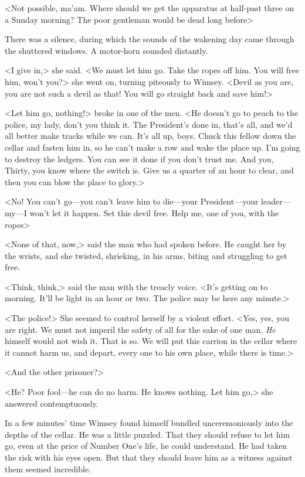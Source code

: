 <Not possible, ma'am. Where should we get the apparatus at half-past three on a Sunday morning? The poor gentleman would be dead long before\longdash>

There was a silence, during which the sounds of the wakening day came through the shuttered windows. A motor-horn sounded distantly.

<I give in,> she said. <We must let him go. Take the ropes off him. You will free him, won't you?> she went on, turning piteously to Wimsey. <Devil as you are, you are not such a devil as that! You will go straight back and save him!>

<Let him go, nothing!> broke in one of the men. <He doesn't go to peach to the police, my lady, don't you think it. The President's done in, that's all, and we'd all better make tracks while we can. It's all up, boys. Chuck this fellow down the cellar and fasten him in, so he can't make a row and wake the place up. I'm going to destroy the ledgers. You can see it done if you don't trust me. And you, Thirty, you know where the switch is. Give us a quarter of an hour to clear, and then you can blow the place to glory.>

<No! You can't go—you can't leave him to die—your President—your leader—my—I won't let it happen. Set this devil free. Help me, one of you, with the ropes\longdash>

<None of that, now,> said the man who had spoken before. He caught her by the wrists, and she twisted, shrieking, in his arms, biting and struggling to get free.

<Think, think,> said the man with the treacly voice. <It's getting on to morning. It'll be light in an hour or two. The police may be here any minute.>

<The police!> She seemed to control herself by a violent effort. <Yes, yes, you are right. We must not imperil the safety of all for the sake of one man. \textit{He} himself would not wish it. That is so. We will put this carrion in the cellar where it cannot harm us, and depart, every one to his own place, while there is time.>

<And the other prisoner?>

<He? Poor fool—he can do no harm. He knows nothing. Let him go,> she answered contemptuously.

In a few minutes' time Wimsey found himself bundled unceremoniously into the depths of the cellar. He was a little puzzled. That they should refuse to let him go, even at the price of Number One's life, he could understand. He had taken the risk with his eyes open. But that they should leave him as a witness against them seemed incredible.


